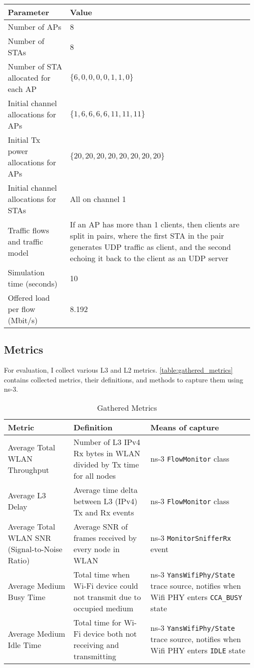 \begin{longtable}{|p{6cm}|p{7cm}|}
\textbf{Parameter} & \textbf{Value} \\ \hline
Number of APs & 8 \\ \hline
Number of STAs & 8 \\ \hline
Number of STA allocated for each AP & $\{6, 0, 0, 0, 0, 1, 1, 0\}$ \\ \hline
Initial channel allocations for APs  & $\{1, 6, 6, 6, 6, 11, 11, 11\}$ \\ \hline
Initial Tx power allocations for APs  & $\{20, 20, 20, 20, 20, 20, 20, 20\}$ \\ \hline
Initial channel allocations for STAs &  All on channel 1 \\ \hline
Traffic flows and traffic model  & If an AP has more than 1 clients, then clients are split in pairs, where the first STA in the pair generates UDP traffic as client, and the second echoing it back to the client as an UDP server \\ \hline
Simulation time (seconds) & 10 \\ \hline
Offered load per flow (Mbit/s) & 8.192 \\ \hline
\end{longtable}

\subsection{Metrics}
For evaluation, I collect various L3 and L2 metrics. \autoref{table:gathered_metrics} contains collected metrics, their definitions, and methods to capture them using ns-3.

\begin{longtable}{|p{5cm}|p{5cm}|p{5cm}|}
\caption{Gathered Metrics}
\label{table:gathered_metrics} \\
\hline
\textbf{Metric} & \textbf{Definition} & \textbf{Means of capture}\\ \hline
Average Total WLAN Throughput & Number of L3 IPv4 Rx bytes in WLAN divided by Tx time for all nodes & ns-3 \texttt{FlowMonitor} class \\
\hline
Average L3 Delay & Average time delta between L3 (IPv4) Tx and Rx events & ns-3 \texttt{FlowMonitor} class \\
\hline
Average Total WLAN SNR (Signal-to-Noise Ratio) & Average SNR of frames received by every node in WLAN & ns-3 \texttt{MonitorSnifferRx} event \\
\hline
Average Medium Busy Time & Total time when Wi-Fi device could not transmit due to occupied medium & ns-3 \texttt{YansWifiPhy/State} trace source, notifies when Wifi PHY enters \texttt{CCA\_BUSY} state \\
\hline
Average Medium Idle Time & Total time for Wi-Fi device both not receiving and transmitting & ns-3 \texttt{YansWifiPhy/State} trace source, notifies when Wifi PHY enters \texttt{IDLE} state\\
\hline
\end{longtable}



